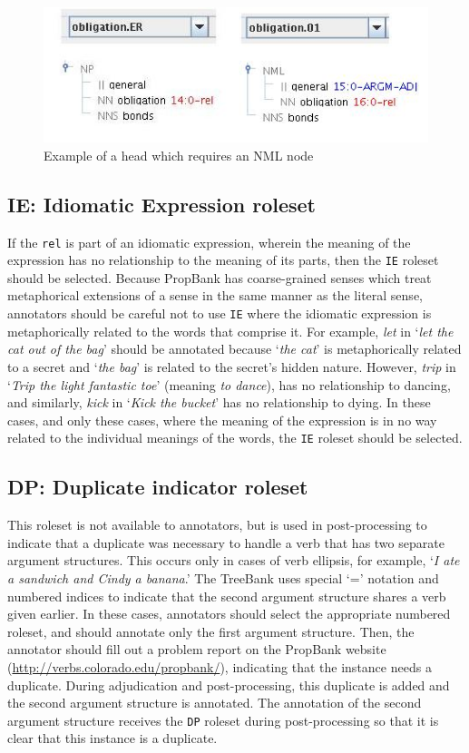 \documentclass[11pt]{report}
\begin{document}
\begin{figure}[htbp]
\centering
\includegraphics[scale=0.4]{img/nmler.png}
\caption{Example of a head which requires an NML node}
\label{fig: NmlEr}
\end{figure}

\subsection{IE: Idiomatic Expression roleset}
If the \texttt{rel} is part of an idiomatic expression, wherein the meaning of the expression has no relationship to the meaning of its parts, then the \texttt{IE} roleset should be selected. Because PropBank has coarse-grained senses which treat metaphorical extensions of a sense in the same manner as the literal sense, annotators should be careful not to use \texttt{IE} where the idiomatic expression is metaphorically related to the words that comprise it. For example, \textit{let} in `\textit{let the cat out of the bag}' should be annotated because `\textit{the cat}' is metaphorically related to a secret and `\textit{the bag}' is related to the secret's hidden nature. However, \textit{trip} in `\textit{Trip the light fantastic toe}' (meaning \textit{to dance}), has no relationship to dancing, and similarly, \textit{kick} in `\textit{Kick the bucket}' has no relationship to dying. In these cases, and only these cases, where the meaning of the expression is in no way related to the individual meanings of the words, the \texttt{IE} roleset should be selected. 

\subsection{DP: Duplicate indicator roleset}
This roleset is not available to annotators, but is used in post-processing to indicate that a duplicate was necessary to handle a verb that has two separate argument structures.  This occurs only in cases of verb ellipsis, for example, `\textit{I ate a sandwich and Cindy a banana}.'  The TreeBank uses special `=' notation and numbered indices to indicate that the second argument structure shares a verb given earlier. In these cases, annotators should select the appropriate numbered roleset, and should annotate only the first argument structure. Then, the annotator should fill out a problem report on the PropBank website (\url{http://verbs.colorado.edu/propbank/}), indicating that the instance needs a duplicate. During adjudication and post-processing, this duplicate is added and the second argument structure is annotated. The annotation of the second argument structure receives the \texttt{DP} roleset during post-processing so that it is clear that this instance is a duplicate.  
\end{document}

